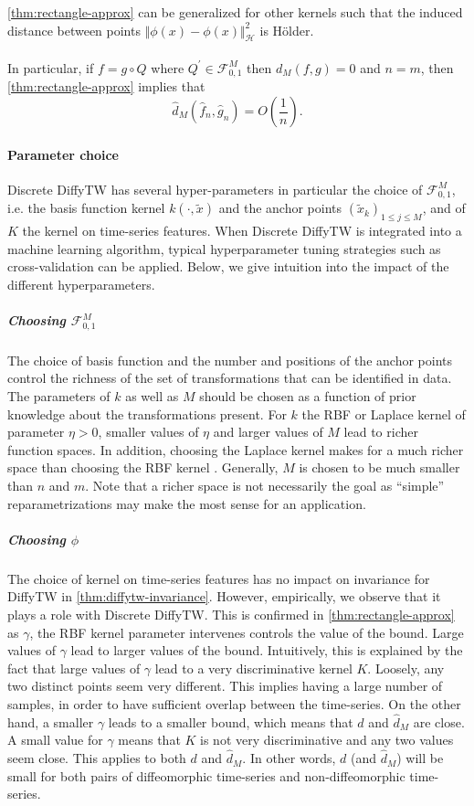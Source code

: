 \cref{thm:rectangle-approx} can be generalized for other kernels such that the induced distance between points $\Vert \phi(x) - \phi(x)\Vert_\mathcal H^2$ is Hölder.

\paragraph{}
In particular, if $f = g \circ Q$ where $Q^\prime \in\mathcal F_{0, 1}^M$ then $d_M(f, g)=0$ and $n=m$, then \cref{thm:rectangle-approx} implies that
\begin{equation}
\hat d_M(\hat f_n, \hat g_n) = O\left(\frac{1}{n}\right).
\end{equation}

\paragraph{Parameter choice}
Discrete DiffyTW has several hyper-parameters in particular the choice of $\mathcal F_{0,1}^M$, i.e. the basis function kernel $k(\cdot, \tilde x)$ and the anchor points $(\tilde x_k)_{1\leq j\leq M}$, and of $K$ the kernel on time-series features. When Discrete DiffyTW is integrated into a machine learning algorithm, typical hyperparameter tuning strategies such as cross-validation can be applied. Below, we give intuition into the impact of the different hyperparameters.

\subparagraph{Choosing $\mathcal F_{0,1}^M$} The choice of basis function and the number and positions of the anchor points control the richness of the set of transformations that can be identified in data. The parameters of $k$ as well as $M$ should be chosen as a function of prior knowledge about the transformations present. For $k$ the RBF or Laplace kernel of parameter $\eta>0$, smaller values of $\eta$ and larger values of $M$ lead to richer function spaces. In addition, choosing the Laplace kernel makes for a much richer space than choosing the RBF kernel \citep{shawe-taylor2004}. Generally, $M$ is chosen to be much smaller than $n$ and $m$. Note that a richer space is not necessarily the goal as ``simple'' reparametrizations may make the most sense for an application.

\subparagraph{Choosing $\phi$} The choice of kernel on time-series features has no impact on invariance for DiffyTW in \cref{thm:diffytw-invariance}. However, empirically, we observe that it plays a role with Discrete DiffyTW. This is confirmed in \cref{thm:rectangle-approx} as $\gamma$, the RBF kernel parameter intervenes controls the value of the bound. Large values of $\gamma$ lead to larger values of the bound. Intuitively, this is explained by the fact that large values of $\gamma$ lead to a very discriminative kernel $K$. Loosely, any two distinct points seem very different. This implies having a large number of samples, in order to have sufficient overlap between the time-series. On the other hand, a smaller $\gamma$ leads to a smaller bound, which means that $d$ and $\hat d_M$ are close. A small value for $\gamma$ means that $K$ is not very discriminative and any two values seem close. This applies to both $d$ and $\hat d_M$. In other words, $d$ (and $\hat d_M$) will be small for both pairs of diffeomorphic time-series and non-diffeomorphic time-series.


